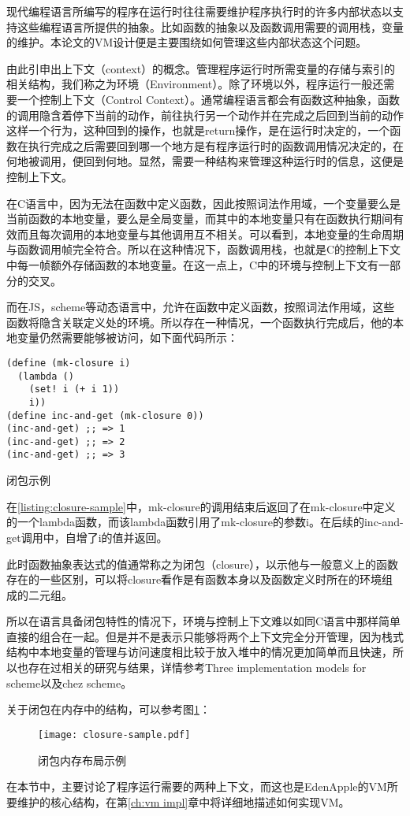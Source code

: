现代编程语言所编写的程序在运行时往往需要维护程序执行时的许多内部状态以支持这些编程语言所提供的抽象。比如函数的抽象以及函数调用需要的调用栈，变量的维护。本论文的VM设计便是主要围绕如何管理这些内部状态这个问题。

由此引申出上下文（context）的概念。管理程序运行时所需变量的存储与索引的相关结构，我们称之为环境（Environment）。除了环境以外，程序运行一般还需要一个控制上下文（Control Context）。通常编程语言都会有函数这种抽象，函数的调用隐含着停下当前的动作，前往执行另一个动作并在完成之后回到当前的动作这样一个行为，这种回到的操作，也就是return操作，是在运行时决定的，一个函数在执行完成之后需要回到哪一个地方是有程序运行时的函数调用情况决定的，在何地被调用，便回到何地。显然，需要一种结构来管理这种运行时的信息，这便是控制上下文。

在C语言中，因为无法在函数中定义函数，因此按照词法作用域，一个变量要么是当前函数的本地变量，要么是全局变量，而其中的本地变量只有在函数执行期间有效而且每次调用的本地变量与其他调用互不相关。可以看到，本地变量的生命周期与函数调用帧完全符合。所以在这种情况下，函数调用栈，也就是C的控制上下文中每一帧额外存储函数的本地变量。在这一点上，C中的环境与控制上下文有一部分的交叉。

而在JS，scheme等动态语言中，允许在函数中定义函数，按照词法作用域，这些函数将隐含关联定义处的环境。所以存在一种情况，一个函数执行完成后，他的本地变量仍然需要能够被访问，如下面代码所示：

\begin{code}
\begin{verbatim}
(define (mk-closure i)
  (lambda ()
    (set! i (+ i 1))
    i))
(define inc-and-get (mk-closure 0))
(inc-and-get) ;; => 1
(inc-and-get) ;; => 2
(inc-and-get) ;; => 3
\end{verbatim}
\caption{闭包示例}
\label{listing:closure-sample}
\end{code}

在\ref{listing:closure-sample}中，mk-closure的调用结束后返回了在mk-closure中定义的一个lambda函数，而该lambda函数引用了mk-closure的参数i。在后续的inc-and-get调用中，自增了i的值并返回。

此时函数抽象表达式的值通常称之为闭包（closure），以示他与一般意义上的函数存在的一些区别，可以将closure看作是有函数本身以及函数定义时所在的环境组成的二元组。

所以在语言具备闭包特性的情况下，环境与控制上下文难以如同C语言中那样简单直接的组合在一起。但是并不是表示只能够将两个上下文完全分开管理，因为栈式结构中本地变量的管理与访问速度相比较于放入堆中的情况更加简单而且快速，所以也存在过相关的研究与结果，详情参考Three implementation models for scheme\cite{dybvig87timpl}以及chez scheme。 

关于闭包在内存中的结构，可以参考图\ref{fig:closure-mem-layout}：

\begin{figure}
\centering
\texttt{[image: closure-sample.pdf]}
\caption{闭包内存布局示例}
\label{fig:closure-mem-layout}
\end{figure}

在本节中，主要讨论了程序运行需要的两种上下文，而这也是EdenApple的VM所要维护的核心结构，在第\ref{ch:vm impl}章中将详细地描述如何实现VM。